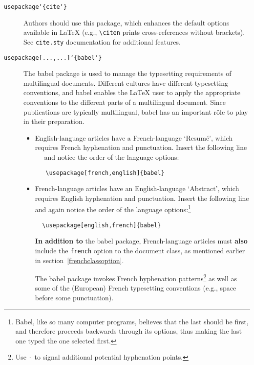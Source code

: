 \begin{description}
   \item [{\tt \blash usepackage\char`\{cite\char`\}}]

         Authors should use this package, which enhances the default
         options available in \LaTeX{} (e.g., \verb|\citen| prints
         cross-references without brackets). See \verb|cite.sty|
         documentation for additional features.

   \item [{\tt \blash usepackage[...,...]\char`\{babel\char`\}}]

         The \textsf{babel}\label{babelinfo} package is used to manage
         the typesetting requirements of multilingual documents.
         Different cultures have different typesetting conventions,
         and \textsf{babel} enables the \LaTeX{} user to apply the
         appropriate conventions to the different parts of a
         multilingual document. Since \NRC{} publications are
         typically multilingual, \textsf{babel} has an important
         r\^ole to play in their preparation.

   \begin{itemize} \itemsep=0pt
      \item English-language articles have a French-language
            `Resum\'e', which requires French hyphenation and
            punctuation. Insert the following line --- and notice the
            order of the language options:

\begin{verbatim}
   \usepackage[french,english]{babel}
\end{verbatim}

      \item French-language articles have an English-language
            `Abstract', which requires English hyphenation and
            punctuation. Insert the following line and again notice
            the order of the language
            options:\footnote{\textsf{Babel}, like so many computer
            programs, believes that the last should be first, and
            therefore proceeds backwards through its options, thus
            making the last one typed the one selected first.}

\begin{verbatim}
  \usepackage[english,french]{babel}
\end{verbatim}

          \textbf{In addition to} the \textsf{babel} package,
          French-language articles must \textbf{also} include the
          \verb|french| option to the document class, as mentioned
          earlier in section~\ref{frenchclassoption}.

          The \textsf{babel} package invokes French hyphenation
          patterns\footnote{Use \texttt{\blash-} to signal additional
          potential hyphenation points.} as well as some of the
          (European) French typesetting conventions (e.g., space before
          some punctuation).
   \end{itemize}
\end{description}

